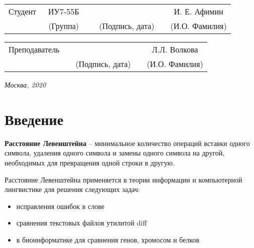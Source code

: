 \documentclass[utf8x, 12pt]{G7-32}
\begin{document}
\vspace{1.5cm}
\noindent
\begin{tabular}{l c c c c c}
    Студент      & ~ИУ7-55Б~               & \hspace{3.5cm} & \hspace{3.5cm}                 & &  И. Е. Афимин \\\cline{2-2}\cline{4-4} \cline{6-6} 
    \hspace{3cm} & {\footnotesize(Группа)} &                & {\footnotesize(Подпись, дата)} & & {\footnotesize(И.О. Фамилия)}
\end{tabular}

\vspace{1cm}

\noindent
\begin{tabular}{l c c c c}
    Преподаватель & \hspace{6cm}   & \hspace{3.5cm}                 & & Л.Л. Волкова \\\cline{3-3} \cline{5-5} 
    \hspace{3cm}  &                & {\footnotesize(Подпись, дата)} & & {\footnotesize(И.О. Фамилия)}
\end{tabular}

\begin{center}	
	\vfill
	\large \textit {Москва, 2020}
\end{center}

\thispagestyle {empty}
\pagebreak

\tableofcontents

\newpage
\chapter*{Введение}
\textbf{Расстояние Левенштейна} -- минимальное количество операций вставки одного символа, удаления одного символа и замены одного символа на другой, необходимых для превращения одной строки в другую.

Расстояние Левенштейна применяется в теории информации и компьютерной лингвистике для решения следующих задач:

\begin{itemize}
	\item исправления ошибок в слове
	\item сравнения текстовых файлов утилитой diff
	\item в биоинформатике для сравнения генов, хромосом и белков
\end{itemize}
\end{document}
